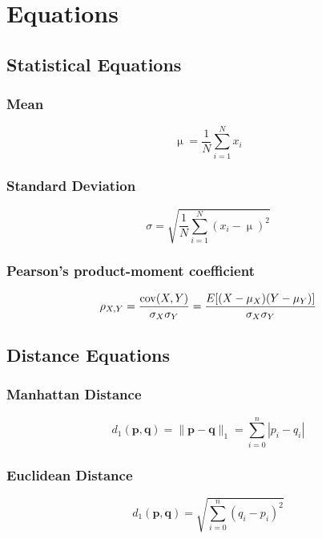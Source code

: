 \chapter{Equations}

\section{Statistical Equations}

\subsection{Mean}
\begin{equation}
\upmu = \frac{1}{N}\sum_{i=1}^{N}x_i
\end{equation}

\subsection{Standard Deviation}
\begin{equation}
\sigma = \sqrt{\frac{1}{N}\sum_{i=1}^{N}(x_i - \upmu)^2}
\end{equation}

\subsection{Pearson's product-moment coefficient}
\begin{equation}
\rho_{X,Y}={\mathrm{cov}(X,Y) \over \sigma_X \sigma_Y} ={E[(X-\mu_X)(Y-\mu_Y)] \over \sigma_X\sigma_Y}
\end{equation}

\section{Distance Equations}

\subsection{Manhattan Distance}
\begin{equation}
d_1(\mathbf{p},\mathbf{q}) = \|\mathbf{p}-\mathbf{q}\|_1 = \sum^{n}_{i=0}{|p_i-q_i|}
\end{equation}

\subsection{Euclidean Distance}
\begin{equation}
d_1(\mathbf{p}, \mathbf{q}) = \sqrt{\sum^{n}_{i=0}({q_i-p_i})^2}
\end{equation}

